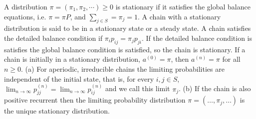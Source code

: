  A distribution $\pi = (\pi_1,\pi_2,\cdots) \ge 0$ is stationary if it satisfies the global balance equations, i.e. $\pi = \pi P$, and $\sum_{j \in S} = \pi_j = 1$. A chain with a stationary distribution is said to be in a stationary state or a steady state.
 A chain satisfies the detailed balance condition if $\pi_i p_{ij} = \pi_j p_{ji}$. If the detailed balance condition is satisfies the global balance condition is satisfied, so the chain is stationary.
 If a chain is initially in a stationary distribution, $a^{(0)} = \pi$, then $a^{(n)} = \pi$ for all $n \ge 0$.
 (a) For aperiodic, irreducible chains the limiting probabilities are independent of the initial state, that is, for every $i, j \in S$, $\lim_{n \to \infty} p^{(n)}_{jj} = \lim_{n \to \infty} p^{(n)}_{ij}$ and we call this limit $\pi_j$. (b) If the chain is also positive recurrent then the limiting probability distribution $\pi = (\ldots, \pi_j, \ldots)$ is the unique stationary distribution.